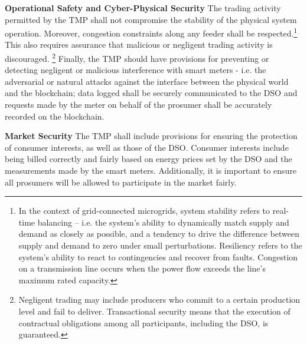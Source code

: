 \documentclass[sigplan]{acmart}
\newcommand{\Abhishek}[1]{\todo[color=yellow!50, linecolor=black!50]{\textbf{Abhishek}: #1}}
\newcommand{\Karla}[1]{\todo[color=green!50, linecolor=black!50]{\textbf{Karla}: #1}}
\newcommand{\Aron}[1]{\todo[color=blue!30, linecolor=black!50]{\textbf{Aron}: #1}}
\begin{document}

\textbf{Operational Safety and Cyber-Physical Security}
The trading activity permitted by the TMP shall not compromise the stability of the physical system operation. Moreover, congestion constraints along any feeder shall be respected.\footnote{In the context of grid-connected microgrids, system stability refers to real-time balancing -- i.e. the system's ability to dynamically match supply and demand as closely as possible, and a tendency to drive the difference between supply and demand to zero under small perturbations. Resiliency refers to the system's ability to react to contingencies and recover from faults. Congestion on a transmission line occurs when the power flow exceeds the line's maximum rated capacity.} This also requires assurance that malicious or negligent trading activity is discouraged.
\footnote{Negligent trading may include producers who commit to a certain production level and fail to deliver. Transactional security means that the execution of contractual obligations among all participants, including the DSO, is guaranteed.} 
Finally, the TMP should have provisions for preventing or detecting negligent or malicious interference with smart meters - i.e. the adversarial or natural attacks against the interface between the physical world and the blockchain; data logged shall be securely communicated to the DSO and requests made by the meter on behalf of the prosumer shall be accurately recorded on the blockchain. 

\textbf{Market Security}
The TMP shall include provisions for ensuring the protection of consumer interests, as well as those of the DSO. Consumer interests include being billed correctly and fairly
based on energy prices set by the DSO and the measurements made by the smart meters. Additionally, it is important to ensure all prosumers will be allowed to participate in the market fairly.


\end{document}

